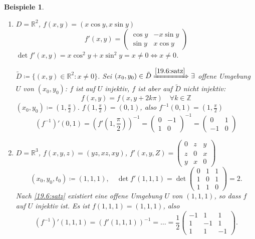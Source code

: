 \documentclass[12pt]{extreport} %
\newcommand{\R}{\mathbb{R}}
\newcommand{\Z}{\mathbb{Z}}
\theoremstyle{named}
\theoremstyle{nnamed}
\theoremstyle{itshape}
\theoremstyle{normal}
\newtheorem*{beispiele}{Beispiele}
\begin{document}
\begin{beispiele} ~\
	\begin{enumerate}
		\item $D = \R^{2}$, $f(x, y) = \left( x \cos y, x \sin y \right)$
			$$ f'(x, y) = \begin{pmatrix} \cos y & - x \sin y \\ \sin y & x \cos y \end{pmatrix} $$
			$\det f'(x, y) = x \cos^{2} y + x \sin^{2} y = x \neq 0 \iff x \neq 0$.
			
			\bigskip
			
			$\tilde{D} \coloneqq \{ (x, y) \in \R^{2} : x \neq 0 \}$. Sei $(x_{0}, y_{0}) \in \tilde{D} \xRightarrow[]{\ref{19.6:satz}} \exists$ offene Umgebung $U$ von $(x_{0}, y_{0})$: $f$ ist auf $U$ injektiv, 
			$f$ ist aber auf $\tilde{D}$ nicht injektiv:
			$$ f(x, y) = f(x, y + 2k\pi) \quad \forall k \in \Z $$
			$(x_{0}, y_{0}) \coloneqq \left( 1, \frac{\pi}{2} \right)$. $f\left(1, \frac{\pi}{2} \right) = (0, 1)$, also $f^{-1}(0, 1) = \left(1, \frac{\pi}{2} \right)$
			$$ \left( f^{-1} \right)'(0,1) = \left( f'\left(1, \frac{\pi}{2} \right) \right)^{-1} = \begin{pmatrix} 0 & -1 \\ 1 & 0 \end{pmatrix}^{-1} = \begin{pmatrix} 0 & 1 \\ -1 & 0 \end{pmatrix} $$
		\item $D = \R^{3}$, $f(x, y, z) = \left( yz, xz, xy \right)$,  $f'(x,y,Z) = \begin{pmatrix} 0 & z & y \\ z & 0 & x \\ y & x & 0 \end{pmatrix}$
			$$  (x_{0}, y_{0}, t_{0}) \coloneqq (1,1,1), \quad \det f'(1,1,1) = \det \begin{pmatrix} 0 & 1 &1 \\ 1 & 0 &1 \\ 1 & 1 & 0 \end{pmatrix} = 2. $$
			 Nach \ref{19.6:satz} existiert eine offene Umgebung $U$ von $(1,1,1)$, so dass $f$ auf $U$ injektiv ist. Es ist $f(1,1,1) = (1,1,1)$, also
			$$ \left( f^{-1} \right)'(1,1,1) = \left( f'(1,1,1) \right)^{-1} = \dotsc = \frac{1}{2} \begin{pmatrix} -1 & 1 & 1 \\ 1 & -1 & 1 \\ 1 & 1 & -1 \end{pmatrix}. $$
	\end{enumerate}	
\end{beispiele}
\end{document}
